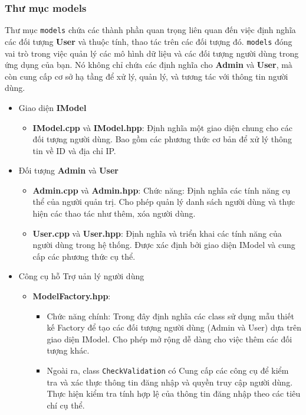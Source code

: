 \subsubsection{Thư mục models}
Thư mục \verb|models| chứa các thành phần quan trọng liên quan đến việc định nghĩa các đối tượng \textbf{User} và thuộc tính, thao tác trên các đối tượng đó. \verb|models| đóng vai trò trong việc quản lý các  mô hình dữ liệu và các đối tượng người dùng trong ứng dụng của bạn. Nó không chỉ chứa các định nghĩa cho \textbf{Admin} và \textbf{User}, mà còn cung cấp cơ sở hạ tầng để xử lý, quản lý, và tương tác với thông tin người dùng.
\begin{itemize}
	\item Giao diện \textbf{IModel}
	\begin{itemize}
		\item \textbf{IModel.cpp} và \textbf{IModel.hpp}: Định nghĩa một giao diện chung cho các đối tượng người dùng. Bao gồm các phương thức cơ bản để xử lý thông tin về ID và địa chỉ IP.
	\end{itemize}
	\item Đối tượng \textbf{Admin} và \textbf{User}
	\begin{itemize}
		\item \textbf{Admin.cpp} và \textbf{Admin.hpp}:  Chức năng: Định nghĩa các tính năng cụ thể của người quản trị. Cho phép quản lý danh sách người dùng và thực hiện các thao tác như thêm, xóa người dùng.
		\item \textbf{User.cpp} và \textbf{User.hpp}: Định nghĩa và triển khai các tính năng của người dùng trong hệ thống. Được xác định bởi giao diện IModel và cung cấp các phương thức cụ thể.
	\end{itemize}
	\item Công cụ hỗ Trợ uản lý người dùng
	\begin{itemize}
		\item \textbf{ModelFactory.hpp}: 
		\begin{itemize}
			\item Chức năng chính: Trong đây định nghĩa các class sử dụng mẫu thiết kế Factory để tạo các đối tượng người dùng (Admin và User) dựa trên giao diện IModel. Cho phép mở rộng dễ dàng cho việc thêm các đối tượng khác.
			\item Ngoài ra, class \verb|CheckValidation| có Cung cấp các công cụ để kiểm tra và xác thực thông tin đăng nhập và quyền truy cập người dùng. Thực hiện kiểm tra tính hợp lệ của thông tin đăng nhập theo các tiêu chí cụ thể. 
		\end{itemize} 
	\end{itemize}
\end{itemize}
